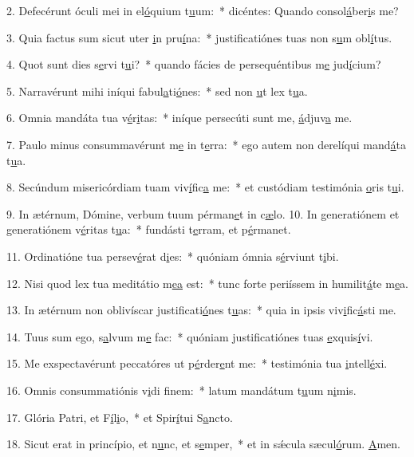 2. Defecérunt óculi mei in el\uline{ó}quium t\uline{u}um:~* dicéntes: Quando consol\uline{á}ber\uline{i}s me?\par 
3. Quia factus sum sicut uter \uline{i}n pru\uline{í}na:~* justificatiónes tuas non s\uline{u}m obl\uline{í}tus.\par 
4. Quot sunt dies s\uline{e}rvi t\uline{u}i?~* quando fácies de persequéntibus m\uline{e} jud\uline{í}cium?\par 
5. Narravérunt mihi iníqui fabul\uline{a}ti\uline{ó}nes:~* sed non \uline{u}t lex t\uline{u}a.\par 
6. Omnia mandáta tua v\uline{é}r\uline{i}tas:~* iníque persecúti sunt me, \uline{á}djuv\uline{a} me.\par 
7. Paulo minus consummavérunt m\uline{e} in t\uline{e}rra:~* ego autem non derelíqui mand\uline{á}ta t\uline{u}a.\par 
8. Secúndum misericórdiam tuam viv\uline{í}fic\uline{a} me:~* et custódiam testimónia \uline{o}ris t\uline{u}i.\par 
9. In ætérnum, Dómine, verbum tuum pérman\uline{e}t in c\uline{æ}lo.
10. In generatiónem et generatiónem v\uline{é}ritas t\uline{u}a:~* fundásti t\uline{e}rram, et p\uline{é}rmanet.\par 
11. Ordinatióne tua persev\uline{é}rat d\uline{i}es:~* quóniam ómnia s\uline{é}rviunt t\uline{i}bi.\par 
12. Nisi quod lex tua meditátio m\uline{e}\uline{a} est:~* tunc forte periíssem in humilit\uline{á}te m\uline{e}a.\par 
13. In ætérnum non oblivíscar justificati\uline{ó}nes t\uline{u}as:~* quia in ipsis viv\uline{i}fic\uline{á}sti me.\par 
14. Tuus sum ego, s\uline{a}lvum m\uline{e} fac:~* quóniam justificatiónes tuas \uline{e}xquis\uline{í}vi.\par 
15. Me exspectavérunt peccatóres ut p\uline{é}rder\uline{e}nt me:~* testimónia tua \uline{i}ntell\uline{é}xi.\par 
16. Omnis consummatiónis v\uline{i}di f\uline{i}nem:~* latum mandátum t\uline{u}um n\uline{i}mis.\par 
17. Glória Patri, et F\uline{í}l\uline{i}o,~* et Spir\uline{í}tui S\uline{a}ncto.\par 
18. Sicut erat in princípio, et n\uline{u}nc, et s\uline{e}mper,~* et in sǽcula sæcul\uline{ó}rum. \uline{A}men.\par 
